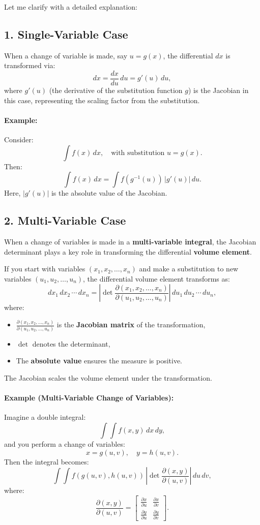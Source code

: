 \documentclass[12pt]{article}
\begin{document}
Let me clarify with a detailed explanation:

\subsection*{1. Single-Variable Case}
When a change of variable is made, say $u = g(x)$, the differential $dx$ is transformed via:
\[
dx = \frac{dx}{du} \, du = g'(u) \, du,
\]
where $g'(u)$ (the derivative of the substitution function $g$) is the Jacobian in this case, representing the scaling factor from the substitution.

\paragraph{Example:}
Consider:
\[
\int f(x) \, dx, \quad \text{with substitution } u = g(x).
\]
Then:
\[
\int f(x) \, dx = \int f(g^{-1}(u)) \, |g'(u)| \, du.
\]
Here, $|g'(u)|$ is the absolute value of the Jacobian.

\subsection*{2. Multi-Variable Case}
When a change of variables is made in a \textbf{multi-variable integral}, the Jacobian determinant plays a key role in transforming the differential \textbf{volume element}.

If you start with variables $(x_1, x_2, \ldots, x_n)$ and make a substitution to new variables $(u_1, u_2, \ldots, u_n)$, the differential volume element transforms as:
\[
dx_1 \, dx_2 \, \cdots \, dx_n = \left| \det \frac{\partial (x_1, x_2, \ldots, x_n)}{\partial (u_1, u_2, \ldots, u_n)} \right| \, du_1 \, du_2 \, \cdots \, du_n,
\]
where:
\begin{itemize}
\item $\frac{\partial (x_1, x_2, \ldots, x_n)}{\partial (u_1, u_2, \ldots, u_n)}$ is the \textbf{Jacobian matrix} of the transformation,
\item $\det$ denotes the determinant,
\item The \textbf{absolute value} ensures the measure is positive.
\end{itemize}

The Jacobian scales the volume element under the transformation.

\paragraph{Example (Multi-Variable Change of Variables):}
Imagine a double integral:
\[
\int \int f(x, y) \, dx \, dy,
\]
and you perform a change of variables:
\[
x = g(u, v), \quad y = h(u, v).
\]
Then the integral becomes:
\[
\int \int f(g(u, v), h(u, v)) \, \left| \det \frac{\partial (x, y)}{\partial (u, v)} \right| \, du \, dv,
\]
where:
\[
\frac{\partial (x, y)}{\partial (u, v)} =
\begin{bmatrix}
\frac{\partial x}{\partial u} & \frac{\partial x}{\partial v} \\
\frac{\partial y}{\partial u} & \frac{\partial y}{\partial v}
\end{bmatrix}.
\]
\end{document}
